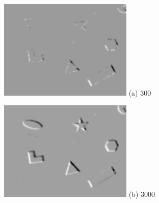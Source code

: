 \begin{figure}[h]
  \begin{minipage}[t]{0.3\textwidth}
    \centering \includegraphics[width = \textwidth]{images/300.jpg}
    (a) \num{300}
  \end{minipage}
  \hfill
  \begin{minipage}[t]{0.3\textwidth}
    \centering \includegraphics[width = \textwidth]{images/3000.jpg}
    (b) \num{3000}
  \end{minipage}
  \hfill
  \begin{minipage}[t]{0.3\textwidth}

\end{minipage}
\end{figure}
